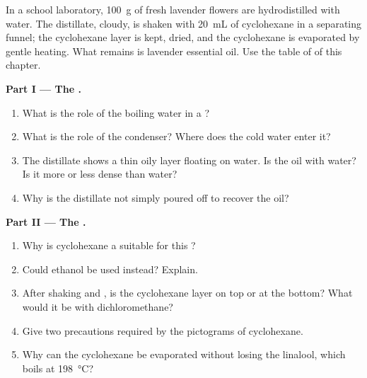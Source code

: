 \begin{problem}
\label{pb:g10:chemical-species:1}
In a school laboratory, \qty{100}{g} of fresh lavender flowers are
hydrodistilled with water. The distillate, cloudy, is shaken with
\qty{20}{mL} of cyclohexane in a separating funnel; the cyclohexane layer
is kept, dried, and the cyclohexane is evaporated by gentle heating. What
remains is lavender essential oil. Use the table of  of this
chapter.

\medskip
\noindent\textbf{Part I --- The .}
\begin{enumerate}
  \item What is the role of the boiling water in a ?
  \item What is the role of the condenser? Where does the cold water enter
        it?
  \item The distillate shows a thin oily layer floating on water. Is the
        oil  with water? Is it more or less dense than water?
  \item Why is the distillate not simply poured off to recover the oil?
\end{enumerate}

\medskip
\noindent\textbf{Part II --- The .}
\begin{enumerate}[resume]
  \item Why is cyclohexane a suitable  for this ?
  \item Could ethanol be used instead? Explain.
  \item After shaking and , is the cyclohexane layer on top or at
        the bottom? What would it be with dichloromethane?
  \item Give two precautions required by the pictograms of cyclohexane.
  \item Why can the cyclohexane be evaporated without losing the
        linalool, which boils at \qty{198}{\celsius}?
\end{enumerate}


\end{problem}
